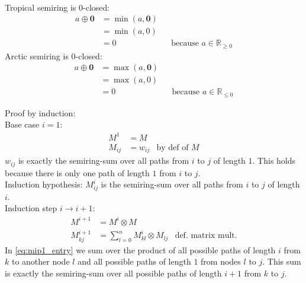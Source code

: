 \documentclass[a4paper,12pt]{ETHexercise}
\begin{document}
\begin{question}\\
	\begin{subquestion}
		Tropical semiring is $0$-closed:
		\begin{align}
			a \oplus \boldsymbol{0} & = \min(a, \boldsymbol{0})                                                 \\
			                        & = \min(a, 0)                                                              \\
			                        & = 0                       &  & \text{because $a \in \mathbb{R}_{\geq 0}$}
		\end{align}
		Arctic semiring is $0$-closed:
		\begin{align}
			a \oplus \boldsymbol{0} & = \max(a, \boldsymbol{0})                                                 \\
			                        & = \max(a, 0)                                                              \\
			                        & = 0                       &  & \text{because $a \in \mathbb{R}_{\leq 0}$}
		\end{align}
	\end{subquestion}
	\begin{subquestion}
		Proof by induction:\\
		Base case $i = 1$:
		\begin{align}
			M^1    & = M                             \\
			M_{ij} & = w_{ij} & \text{by def of $M$}
		\end{align}
		$w_{ij}$ is exactly the semiring-sum over all paths from $i$ to $j$ of length $1$. This holds because there is only one path of length $1$ from $i$ to $j$.\\
		Induction hypothesis:
		$M^{i}_{ij}$ is the semiring-sum over all paths from $i$ to $j$ of length $i$.\\
		Induction step $i \rightarrow i + 1$:\\
		\begin{align}
			M^{i + 1}    & = M^i \otimes M                                                                             \\
			M^{i+1}_{kj} & = \sum_{l=0}^{n} M^{i}_{kl} \otimes M_{lj} & \text{def. matrix mult.} \label{eq:mip1_entry}
		\end{align}
		In \cref*{eq:mip1_entry} we sum over the product of all possible paths of length $i$ from $k$ to another node $l$ and all possible paths of length $1$ from nodes $l$ to $j$. This sum is exactly the semiring-sum over all possible paths of length $i + 1$ from $k$ to $j$.\\

\end{subquestion}
\end{question}
\end{document}
